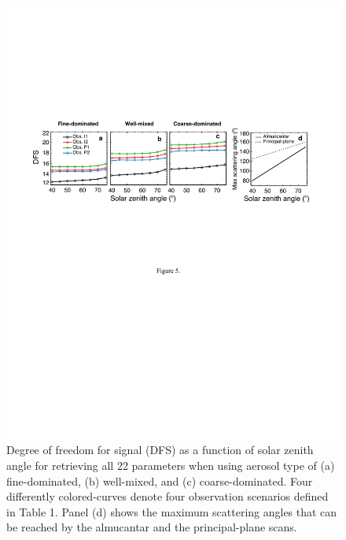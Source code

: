 \begin{figure}[t]
  \centering
  \includegraphics[width={\textwidth}]{figures/info05.pdf}
  \caption{Degree of freedom for signal (DFS) as a function of solar zenith
angle for retrieving all 22 parameters when using aerosol type of (a)
fine-dominated,  (b) well-mixed, and (c) coarse-dominated. Four differently
colored-curves denote four observation scenarios defined in Table 1. Panel (d)
shows the maximum scattering angles that can be reached by the almucantar and
the principal-plane scans.}
  \label{fig:infodfs1}
\end{figure}

